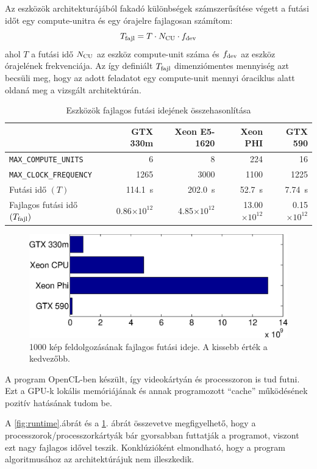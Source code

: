 	Az eszközök architekturájából fakadó különbségek számszerűsítése végett a futási időt egy compute-unitra és egy
	órajelre fajlagosan számítom:
	\begin{equation}
	T_{\rm fajl} = T \cdot N_{\rm CU} \cdot f_{\rm dev}
	\end{equation}
	ahol $T$ a futási idő $N_{\rm CU}$ az eszköz compute-unit
        száma és $f_{\rm dev}$ az eszköz órajelének frekvenciája. Az
        így definiált $T_{\rm fajl}$ dimenziómentes mennyiség azt
        becsüli meg, hogy az adott feladatot egy compute-unit mennyi
        óraciklus alatt oldaná meg a vizsgált architektúrán.
        
	\begin{table}[H]
	\footnotesize
	\centering
	
	\setlength{\extrarowheight}{3pt}
	\begin{tabular}{ l | r | r | r | r}
		 & GTX 330m & Xeon E5-1620 & Xeon PHI & GTX 590\\ \hline
		\texttt{MAX\_COMPUTE\_UNITS} & 6 & 8 & 224 & 16\\
		\texttt{MAX\_CLOCK\_FREQUENCY} & 1265 & 3000 & 1100 & 1225\\\hline\hline
		Futási idő $(T)$ & 114.1~s & 202.0~s & 52.7~s & 7.74~s\\
		Fajlagos futási idő $(T_{\rm fajl})$ & 0.86$\times 10^{12}$ & 4.85$\times 10^{12}$ & 13.00$\times 10^{12}$ & 0.15$\times 10^{12}$
	\end{tabular}
	
	\caption{Eszközök fajlagos futási idejének összehasonlítása}
	\label{table:results_f}
	\end{table}	
	
	\begin{figure}[!h]
	\begin{center}
	  \includegraphics[width=0.9\columnwidth]{figures/eps/runtime_f.eps}
	  \caption{1000 kép feldolgozásának fajlagos futási ideje. A kissebb érték a kedvezőbb.}
	  \label{fig:runtime_f}
	\end{center}
	\end{figure}
	
	A program OpenCL-ben készült, így videokártyán és processzoron is tud futni.
	Ezt a GPU-k lokális memóriájának és annak programozott ``cache'' működésének pozitív hatásának tudom be.
	
	A \ref{fig:runtime}.ábrát és a \ref{fig:runtime_f}. ábrát összevetve megfigyelhető, hogy a processzorok/processzorkártyák bár
	gyorsabban futtatják a programot, viszont ezt nagy fajlagos idővel teszik. Konklúzióként elmondható, hogy a program
	algoritmusához az architektúrájuk nem illeszkedik.
	
